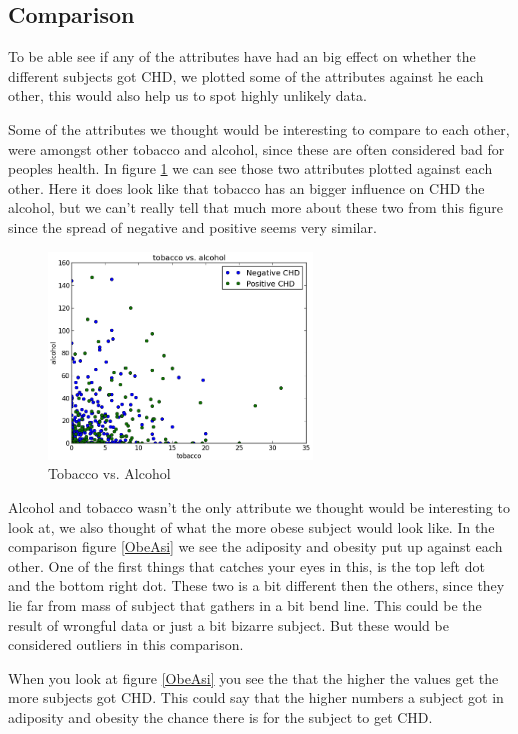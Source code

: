 \subsection{Comparison}
To be able see if any of the attributes have had an big effect on whether the different subjects got CHD, we plotted some of the attributes against he each other, this would also help us to spot highly unlikely data.

Some of the attributes we thought would be interesting to compare to each other, were amongst other tobacco and alcohol, since these are often considered bad for peoples health. In figure \ref{AlcoTobac} we can see those two attributes plotted against each other. Here it does look like that tobacco has an bigger influence on CHD the alcohol, but we can't really tell that much more about these two from this figure since the spread of negative and positive seems very similar.

\begin{figure}[H]
\centering
\includegraphics[width=7cm, keepaspectratio=true]{pictures/tobaccoAlcohol.png}
\vspace{-0.4cm}
\caption{\footnotesize Tobacco vs. Alcohol}
\label{AlcoTobac}
\end{figure}

Alcohol and tobacco wasn't the only attribute we thought would be interesting to look at, we also thought of what the more obese subject would look like. In the comparison figure \ref{ObeAsi} we see the adiposity and obesity put up against each other. One of the first things that catches your eyes in this, is the top left dot and the bottom right dot. These two is a bit different then the others, since they lie far from mass of subject that gathers in a bit bend line. This could be the result of wrongful data or just a bit bizarre subject. But these would be considered outliers in this comparison.

When you look at figure \ref{ObeAsi} you see the that the higher the values get the more subjects got CHD. This could say that the higher numbers a subject got in adiposity and obesity the chance there is for the subject to get CHD.


